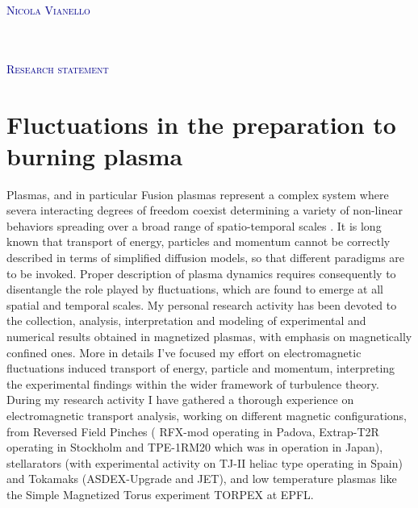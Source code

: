 \documentclass[12pt,a4paper]{article}
\begin{document}
\begin{flushright}
\textcolor{darkBlue}{ \Huge
\lettrine[lines=3,findent=-1pt, loversize = -0.42,
lraise=0.6]{N}{icola Vianello}}\\[2pt]
\textcolor{Gray}{}\\
\textcolor{Gray}{}\\
\textcolor{Gray}{}
\end{flushright}
\begin{flushleft} 
\textcolor{darkBlue}{ \Huge
\lettrine[lines=2,findent=-1pt, loversize = -0.42,
lraise=0.6]{R}{esearch statement}} 
\end{flushleft}


\section*{Fluctuations in the preparation to burning plasma}
Plasmas, and in particular Fusion plasmas represent a complex system
where severa interacting degrees of freedom coexist determining a
variety of non-linear behaviors spreading over a broad range of
spatio-temporal scales
\cite{Kadomtsev:1992us,Sornette:2006dt}. It is long known that 
transport of energy, particles and momentum cannot be correctly
described in terms of simplified diffusion models, so that different
paradigms are to be invoked. Proper description of plasma
dynamics requires consequently to disentangle the role played by
fluctuations, which are found to emerge at all spatial and temporal
scales. My personal research activity has been devoted to the collection, analysis,
interpretation and modeling of experimental and numerical results
obtained in magnetized plasmas, with emphasis
on magnetically confined ones. More in details I've focused my effort
on electromagnetic fluctuations induced transport of energy, particle
and momentum, interpreting the experimental findings within the wider framework of turbulence
theory. During my research activity I have gathered a thorough 
experience on electromagnetic transport analysis, working on different
magnetic configurations, from Reversed Field Pinches (
RFX-mod operating in Padova, Extrap-T2R operating in Stockholm and
TPE-1RM20 which was in operation in Japan), stellarators (with
experimental activity on TJ-II heliac type operating in Spain) and Tokamaks
(ASDEX-Upgrade and JET), and low temperature plasmas like the Simple
Magnetized Torus experiment TORPEX at EPFL. 
\end{document}
